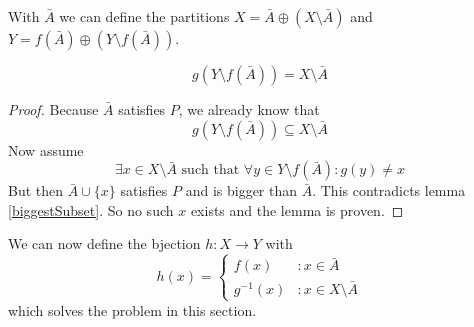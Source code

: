With $\bar{A}$ we can define the partitions $X=\bar{A} \oplus (X \setminus \bar{A})$ and $Y=f(\bar{A}) \oplus (Y \setminus f(\bar{A}))$.

\begin{lem}
$$
g(Y \setminus f(\bar{A})) = X \setminus \bar{A}
$$
\end{lem}

\begin{proof}
Because $\bar{A}$ satisfies $P$, we already know that 
$$
g(Y \setminus f(\bar{A})) \subseteq X \setminus \bar{A}
$$
Now assume
$$
\exists x \in X \setminus \bar{A} \text{ such that } \forall y \in Y \setminus f(\bar{A}): g(y) \neq x
$$
But then $\bar{A} \cup \{x\}$ satisfies $P$ 
 and is bigger than $\bar{A}$. This contradicts lemma \ref{biggestSubset}. So no such $x$ exists and the lemma is proven.
\end{proof}


We can now define the bjection $h: X \to Y$ with
$$
h(x) = \begin{cases}
         f(x) & : x \in \bar{A}\\
         g^{-1}(x) & : x \in X \setminus \bar{A}
      \end{cases} 
$$
which solves the problem in this section. 

